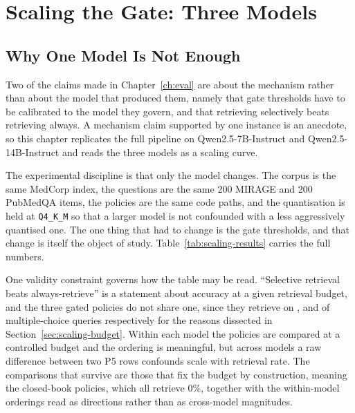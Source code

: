 
\chapter{Scaling the Gate: Three Models}
\label{ch:scaling}

\section{Why One Model Is Not Enough}
\label{sec:scaling-why}

Two of the claims made in Chapter~\ref{ch:eval} are about the mechanism
rather than about the model that produced them, namely that gate thresholds
have to be calibrated to the model they govern, and that retrieving
selectively beats retrieving always. A mechanism claim supported by one
instance is an anecdote, so this chapter replicates the full pipeline on
Qwen2.5-7B-Instruct and Qwen2.5-14B-Instruct \citep{qwen25} and reads the
three models as a scaling curve.

The experimental discipline is that only the model changes. The corpus is the
same MedCorp index, the questions are the same 200 MIRAGE and 200 PubMedQA
items, the policies are the same code paths, and the quantisation is held at
\texttt{Q4\_K\_M} so that a larger model is not confounded with a less
aggressively quantised one. The one thing that had to change is the gate
thresholds, and that change is itself the object of study.
Table~\ref{tab:scaling-results} carries the full numbers.



One validity constraint governs how the table may be read. ``Selective
retrieval beats always-retrieve'' is a statement about accuracy at a given
retrieval budget, and the three gated policies do not share one, since they
retrieve on \retPfiveMcq{}, \retQwenPfiveMcq{} and
\retQwenFourteenPfiveMcq{} of multiple-choice queries respectively for the
reasons dissected in Section~\ref{sec:scaling-budget}. Within each model the
policies are compared at a controlled budget and the ordering is meaningful,
but across models a raw difference between two P5 rows confounds scale with
retrieval rate. The comparisons that survive are those that fix the budget by
construction, meaning the closed-book policies, which all retrieve 0\%,
together with the within-model orderings read as directions rather than as
cross-model magnitudes.

